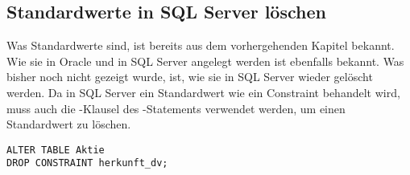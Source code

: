       \subsection{Standardwerte in SQL Server löschen}
        \label{sqlserverdefaultconstraint}
        Was Standardwerte sind, ist bereits aus dem vorhergehenden Kapitel bekannt. Wie sie in Oracle und in SQL Server angelegt werden ist ebenfalls bekannt. Was bisher noch nicht gezeigt wurde, ist, wie sie in SQL Server wieder gelöscht werden. Da in SQL Server ein Standardwert wie ein Constraint behandelt wird, muss auch die -Klausel des -Statements verwendet werden, um einen Standardwert zu löschen.
        \begin{lstlisting}[language=ms_sql,caption={Einen Standardwert in SQL Server löschen},label=sql09_23]
ALTER TABLE Aktie
DROP CONSTRAINT herkunft_dv;
        \end{lstlisting}
